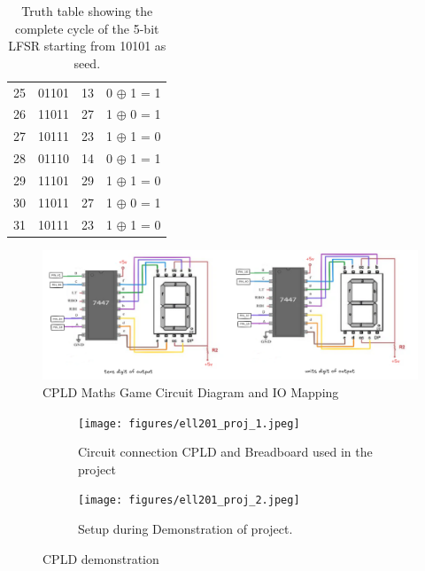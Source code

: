 \documentclass[10pt,a4paper,twocolumn,twoside]{tau-class/tau}
\begin{document}
\begin{table}[!t]
\begin{tabular}{|c|c|c|c|}
            25 & 01101 & 13 & 0 $\oplus$ 1 = 1 \\
            26 & 11011 & 27 & 1 $\oplus$ 0 = 1 \\
            27 & 10111 & 23 & 1 $\oplus$ 1 = 0 \\
            28 & 01110 & 14 & 0 $\oplus$ 1 = 1 \\
            29 & 11101 & 29 & 1 $\oplus$ 1 = 0 \\
            30 & 11011 & 27 & 1 $\oplus$ 0 = 1 \\
            31 & 10111 & 23 & 1 $\oplus$ 1 = 0 \\
            \hline
        \end{tabular}
    \caption{Truth table showing the complete cycle of the 5-bit LFSR starting from 10101 as seed.}
    \end{table}


    \begin{figure}[!t]
        \includegraphics[width=.83\textwidth]{figures/circuit_diagram.png}
        \caption{CPLD Maths Game Circuit Diagram and IO Mapping}
        \label{fig:circuitdiagram}
    \end{figure}
    
    \begin{figure}[!t] 
        \centering
        \begin{subfigure}[b]{0.9\linewidth}
            \texttt{[image: figures/ell201\_proj\_1.jpeg]}
            \caption{Circuit connection CPLD and Breadboard used in the project}
            \label{fig:figa}
        \end{subfigure}
        \vspace{1cm}
        \begin{subfigure}[b]{0.9\linewidth}
            \texttt{[image: figures/ell201\_proj\_2.jpeg]}
            \caption{Setup during Demonstration of project.}
            \label{fig:figb}
        \end{subfigure}
        \caption{CPLD demonstration}
        \label{fig:examplefloat}
    \end{figure}
\end{document}
